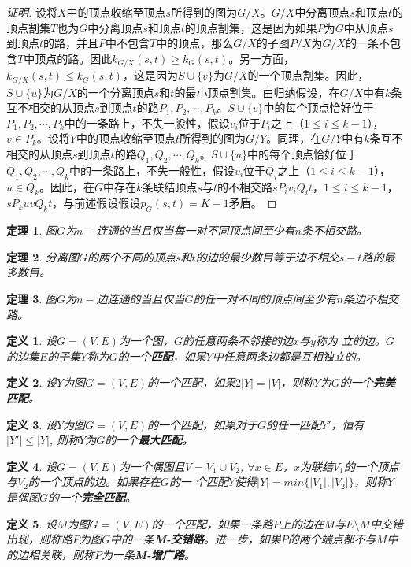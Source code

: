 \documentclass{book}[oneside]
\newtheorem{Def}{定义}[chapter]
\newtheorem{Thm}{定理}[chapter]
\begin{document}
\begin{CJK*}{UTF8}{gbsn}
\begin{proof}[证明]
    设将$X$中的顶点收缩至顶点$s$所得到的图为$G/X$。$G/X$中分离顶点$s$和顶点$t$的顶点割集$T$也为$G$中分离顶点$s$和顶点$t$的顶点割集，这是因为如果$P$为$G$中从顶点$s$到顶点$t$的路，并且$P$中不包含$T$中的顶点，那么$G/X$的子图$P/X$为$G/X$的一条不包含$T$中顶点的路。因此$k_{G/X}(s,t)\geq k_{G}(s,t)$。另一方面，$k_{G/X}(s,t)\leq k_{G}(s,t)$，这是因为$S\cup \{v\}$为$G/X$的一个顶点割集。因此，$S\cup \{u\}$为$G/X$的一个分离顶点$s$和$t$的最小顶点割集。由归纳假设，在$G/X$中有$k$条互不相交的从顶点$s$到顶点$t$的路$P_1,P_2,\cdots,P_k$。$S\cup \{v\}$中的每个顶点恰好位于$P_1,P_2,\cdots,P_k$中的一条路上，不失一般性，假设$v_i$位于$P_i$之上（$1\leq i \leq k-1$），$v\in P_k$。设将$Y$中的顶点收缩至顶点$t$所得到的图为$G/Y$。同理，在$G/Y$中有$k$条互不相交的从顶点$s$到顶点$t$的路$Q_1, Q_2, \cdots, Q_k$。$S\cup \{u\}$中的每个顶点恰好位于$Q_1,Q_2,\cdots,Q_k$中的一条路上，不失一般性，假设$v_i$位于$Q_i$之上（$1\leq i \leq k-1$），$u\in Q_k$。因此，在$G$中存在$k$条联结顶点$s$与$t$的不相交路$sP_iv_iQ_it$，$1\leq i \leq k-1$，$sP_kuvQ_kt$，与前述假设假设$p_G(s,t) = K - 1$矛盾。
  \end{proof}
  \begin{Thm}
    图$G$为$n-$连通的当且仅当每一对不同顶点间至少有$n$条不相交路。
  \end{Thm}
  \begin{Thm}
    分离图$G$的两个不同的顶点$s$和$t$的边的最少数目等于边不相交$s-t$路的最多数目。
  \end{Thm}
  \begin{Thm}
    图$G$为$n-$边连通的当且仅当$G$的任一对不同的顶点间至少有$n$条边不相交路。
  \end{Thm}
    \begin{Def}
    设$G=(V,E)$为一个图，$G$的任意两条不邻接的边$x$与$y$称为{
      立}的边。$G$的边集$E$的子集$Y$称为$G$的一个{\bfseries 匹配}，如果$Y$中任意两条边都是互相独立的。
  \end{Def}

    \begin{Def}
    设$Y$为图$G=(V,E)$的一个匹配，如果$2|Y|=|V|$，则称$Y$为$G$的一个{\bfseries 完美匹配}。
  \end{Def}

      \begin{Def}
   设$Y$为图$G=(V,E)$的一个匹配，如果对于$G$的任一匹配$Y'$，恒有$|Y'|\leq |Y|$, 则称$Y$为$G$的一个{\bfseries 最大匹配}。
  \end{Def}

    \begin{Def}
    设$G=(V,E)$为一个偶图且$V=V_1\cup V_2$,
    $\forall x \in
    E$，$x$为联结$V_1$的一个顶点与$V_2$的一个顶点的边。如果存在$G$的一
    个匹配$Y$使得$|Y|=min\{|V_1|,|V_2|\}$，则称$Y$是偶图$G$的一个{\bfseries 完全匹配}。
  \end{Def}
  \begin{Def}
  设$M$为图$G=(V,E)$的一个匹配，如果一条路$P$上的边在$M$与$E\setminus M$中交错出现，则称路$P$为图$G$中的一条{\bfseries M-交错路}。进一步，如果$P$的两个端点都不与$M$中的边相关联，则称$P$为一条{\bfseries M-增广路}。
  \end{Def}



\end{CJK*}
\end{document}
